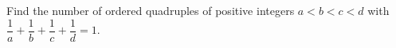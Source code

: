 Find the number of ordered quadruples of positive integers $a<b<c<d$ with $\dfrac{1}{a}+\dfrac{1}{b}+\dfrac{1}{c}+\dfrac{1}{d}=1$.

